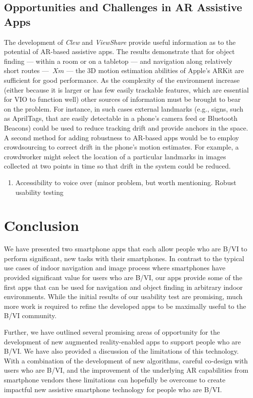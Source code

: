 \documentclass[chi_draft]{sigchi}
\begin{document}
\subsection{Opportunities and Challenges in AR Assistive Apps}
The development of \emph{Clew} and \emph{ViewShare} provide useful information as to the potential of AR-based assistive apps.  The results demonstrate that for object finding --- within a room or on a tabletop --- and navigation along relatively short routes --- $~Xm$ --- the 3D motion estimation abilities of Apple's ARKit are sufficient for good performance.  As the complexity of the environment increase (either because it is larger or has few easily trackable features, which are essential for VIO to function well) other sources of information must be brought to bear on the problem.  For instance, in such cases external landmarks (e.g., signs, such as AprilTags, that are easily detectable in a phone's camera feed or Bluetooth Beacons) could be used to reduce tracking drift and provide anchors in the space.  A second method for adding robustness to AR-based apps would be to employ crowdsourcing to correct drift in the phone's motion estimates.  For example, a crowdworker might select the location of a particular  landmarks in images collected at two points in time so that drift in the system could be reduced.

\begin{enumerate}
\item Accessibility to voice over (minor problem, but worth mentioning.  Robust usability testing
\end{enumerate}
\balance{}

\section{Conclusion}
We have presented two smartphone apps that each allow people who are B/VI to perform significant, new tasks with their smartphones.  In contrast to the typical use cases of indoor navigation and image process where smartphones have provided significant value for users who are B/VI, our apps provide some of the first apps that can be used for navigation and object finding in arbitrary indoor environments.  While the initial results of our usability test are promising, much more work is required to refine the developed apps to be maximally useful to the B/VI community.

Further, we have outlined several promising areas of opportunity for the development of new augmented reality-enabled apps to support people who are B/VI.  We have also provided a discussion of the limitations of this technology.  With a combination of the development of new algorithms, careful co-design with users who are B/VI, and the improvement of the underlying AR capabilities from smartphone vendors these limitations can hopefully be overcome to create impactful new assistive smartphone technology for people who are B/VI.  
\end{document}
